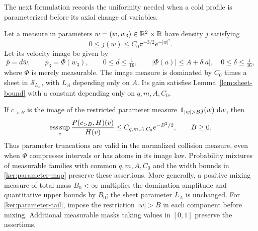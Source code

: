 The next formulation records the uniformity needed when a cold
profile is parameterized before its axial change of variables.

\begin{lemma}
\label{ker:parameter-sheets}
Let a measure in parameters $w=(\bar w,w_3)\in\mathbb R^2\times\mathbb R$ have
density $j$ satisfying
\[
 0\leq j(w)\leq C_0\pi^{-3/2}e^{-|w|^2}.
\]
Let its velocity image be given by
\begin{equation}\label{ker:parameter-map}
 \bar p=d\bar w,\qquad p_3=\Phi(w_3),\qquad
 0\leq d\leq\tfrac1{16},\qquad
 |\Phi(a)|\leq A+\delta|a|,\quad0\leq\delta\leq\tfrac1{16},
\end{equation}
where $\Phi$ is merely measurable. The image measure is dominated
by $C_0$ times a sheet in $\mathcal S_{L_A}$, with $L_A$ depending
only on $A$. Its gain satisfies Lemma~\ref{lem:sheet-bound} with a
constant depending only on $q,m,A,C_0$.

If $c_{>B}$ is the image of the restricted parameter measure
$\ind_{|w|>B}j(w)\,\dd w$, then
\begin{equation}\label{ker:parameter-tail}
 \operatorname*{ess\,sup}_v\frac{P(c_{>B},H)(v)}{H(v)}
 \leq C_{q,m,A,C_0}e^{-B^2/2},\qquad B\geq0.
\end{equation}
Thus parameter truncations are valid in the normalized collision
measure, even when $\Phi$ compresses intervals or has atoms in its
image law. Probability mixtures of measurable families with common
$q,m,A,C_0$ and the width bounds in \eqref{ker:parameter-map} preserve
these assertions. More generally, a positive mixing measure of total
mass $B_0<\infty$ multiplies the domination amplitude and quantitative
upper bounds by $B_0$; the sheet parameter $L_A$ is unchanged.
For \eqref{ker:parameter-tail}, impose the restriction $|w|>B$ in
each component before mixing. Additional measurable masks taking
values in $[0,1]$ preserve the assertions.
\end{lemma}


